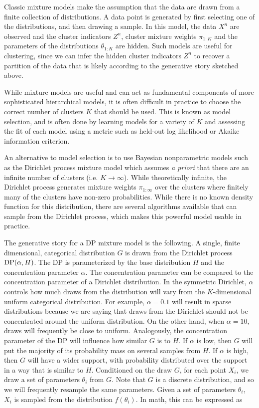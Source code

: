 Classic mixture models make the assumption that the data are drawn
from a finite collection of distributions. A data point is generated
by first selecting one of the distributions, and then drawing a
sample. In this model, the data $X^n$ are observed and the cluster
indicators $Z^n$, cluster mixture weights $\pi_{1:K}$ and the
parameters of the distributions $\theta_{1:K}$ are hidden. Such models
are useful for clustering, since we can infer the hidden cluster
indicators $Z^n$ to recover a partition of the data that is likely
according to the generative story sketched above.

While mixture models are useful and can act as fundamental components
of more sophisticated hierarchical models, it is often difficult in
practice to choose the correct number of clusters $K$ that should be
used. This is known as model selection, and is often done by learning
models for a variety of $K$ and assessing the fit of each model using
a metric such as held-out log likelihood or Akaike information
criterion.

An alternative to model selection is to use Bayesian nonparametric
models such as the Dirichlet process mixture model \cite{antoniak1974}
which assumes \textit{a priori} that there are an infinite number of
clusters (i.e. $K \to \infty$). While theoretically infinite, the
Dirichlet process generates mixture weights $\pi_{1:\infty}$ over the
clusters where finitely many of the clusters have non-zero
probabilities. While there is no known density function for this
distribution, there are several algorithms available that can sample
from the Dirichlet process, which makes this powerful model usable in
practice.

The generative story for a DP mixture model is the following. A
single, finite dimensional, categorical distribution $G$ is drawn from
the Dirichlet process $\mathrm{DP}(\alpha, H)$. The DP is parameterized by the
base distribution $H$ and the concentration parameter $\alpha$. The
concentration parameter can be compared to the concentration parameter
of a Dirichlet distribution. In the symmetric Dirichlet, $\alpha$
controls how much draws from the distribution will vary from the
$K$-dimensional uniform categorical distribution. For example, $\alpha
= 0.1$ will result in sparse distributions because we are saying that
draws from the Dirichlet should not be concentrated around the uniform
distribution. On the other hand, when $\alpha = 10$, draws will
frequently be close to uniform. Analogously, the concentration
parameter of the DP will influence how similar $G$ is to $H$. If
$\alpha$ is low, then $G$ will put the majority of its probability
mass on several samples from $H$. If $\alpha$ is high, then $G$ will
have a wider support, with probability distributed over the support in
a way that is similar to $H$. Conditioned on the draw $G$, for each
point $X_i$, we draw a set of parameters $\theta_i$ from $G$. Note
that $G$ is a discrete distribution, and so we will frequently
resample the same parameters. Given a set of parameters $\theta_i$,
$X_i$ is sampled from the distribution $f(\theta_i)$. In math, this
can be expressed as

